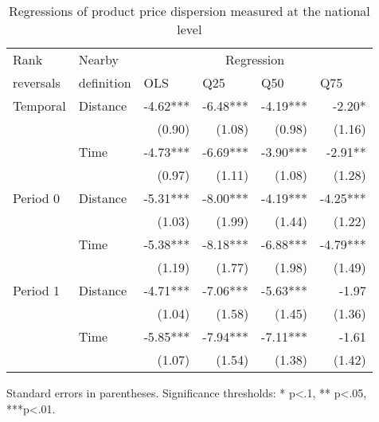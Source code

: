 \documentclass[english]{article}
\begin{document}
\begin{table}[H]
\caption{Regressions of product price dispersion measured at the national level}
\label{tab:reg_rank_reversals}
\begin{threeparttable}
\renewcommand{\arraystretch}{0.7}%
\begin{tabular}{rrrrrr}
    \toprule
    \toprule
    \multicolumn{1}{l}{Rank} & \multicolumn{1}{l}{Nearby} & \multicolumn{4}{c}{Regression} \\
    \multicolumn{1}{l}{reversals} & \multicolumn{1}{l}{definition} & \multicolumn{1}{l}{OLS} & \multicolumn{1}{l}{Q25} & \multicolumn{1}{l}{Q50} & \multicolumn{1}{l}{Q75} \\
    \midrule
    \multicolumn{1}{l}{Temporal} & \multicolumn{1}{l}{Distance} & -4.62*** & -6.48*** & -4.19*** & -2.20* \\
          &       & (0.90) & (1.08) & (0.98) & (1.16) \\
          & \multicolumn{1}{l}{Time} & -4.73*** & -6.69*** & -3.90*** & -2.91** \\
          &       & (0.97) & (1.11) & (1.08) & (1.28) \\
    \midrule
    \multicolumn{1}{l}{Period 0} & \multicolumn{1}{l}{Distance} & -5.31*** & -8.00*** & -4.19*** & -4.25*** \\
          &       & (1.03) & (1.99) & (1.44) & (1.22) \\
          & \multicolumn{1}{l}{Time} & -5.38*** & -8.18*** & -6.88*** & -4.79*** \\
          &       & (1.19) & (1.77) & (1.98) & (1.49) \\
    \midrule
    \multicolumn{1}{l}{Period 1} & \multicolumn{1}{l}{Distance} & -4.71*** & -7.06*** & -5.63*** & -1.97 \\
          &       & (1.04) & (1.58) & (1.45) & (1.36) \\
          & \multicolumn{1}{l}{Time} & -5.85*** & -7.94*** & -7.11*** & -1.61 \\
          &       & (1.07) & (1.54) & (1.38) & (1.42) \\
    \bottomrule
    \bottomrule
\end{tabular}
\begin{tablenotes}
      \small
	  \item Standard errors in parentheses. Significance thresholds: * p<.1, ** p<.05, ***p<.01.
\end{tablenotes}
\end{threeparttable}
\end{table}
\end{document}
